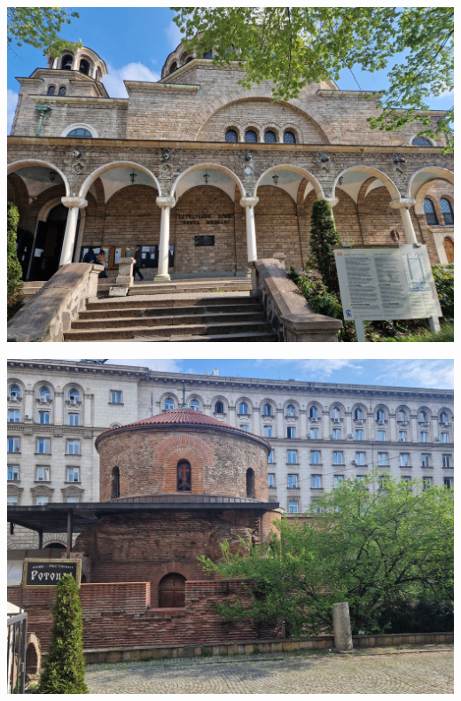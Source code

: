 \documentclass[11pt]{article}
\begin{document}
\begin{center}
\includegraphics[width=1.0\textwidth]{images/20230421_092428.jpg}
\end{center}

\begin{center}
\includegraphics[width=1.0\textwidth]{images/20230421_092737.jpg}
\end{center}
\end{document}
